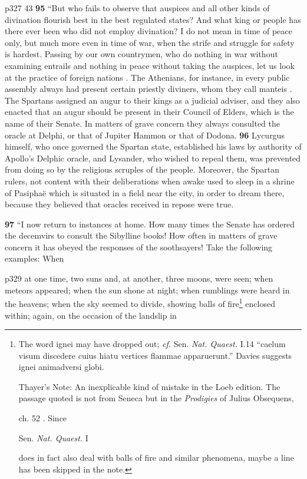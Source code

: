 p327
43
\textbf{95} ``But who fails to observe that auspices and all other kinds of divination flourish best in the best regulated states? And what king or people has there ever been who did not employ divination? I do not mean in time of peace only, but much more even in time of war, when the strife and struggle for safety is hardest. Passing by our own countrymen, who do nothing in war without examining entrails and nothing in peace without taking the auspices, let us look at the practice of foreign nations . The Athenians, for instance, in every public assembly always had present certain priestly diviners, whom they call manteis . The Spartans assigned an augur to their kings as a judicial adviser, and they also enacted that an augur should be present in their Council of Elders, which is the name of their Senate. In matters of grave concern they always consulted the oracle at Delphi, or that of Jupiter Hammon or that of Dodona. \textbf{96} Lycurgus himself, who once governed the Spartan state, established his laws by authority of Apollo's Delphic oracle, and Lysander, who wished to repeal them, was prevented from doing so by the religious scruples of the people. Moreover, the Spartan rulers, not content with their deliberations when awake used to sleep in a shrine of Pasiphaë which is situated in a field near the city, in order to dream there, because they believed that oracles received in repose were true.

\textbf{97} ``I now return to instances at home. How many times the Senate has ordered the decemvirs to consult the Sibylline books! How often in matters of grave concern it has obeyed the responses of the soothsayers! Take the following examples: When

p329 at one time, two suns and, at another, three moons, were seen; when meteors appeared; when the sun shone at night; when rumblings were heard in the heavens; when the sky seemed to divide, showing balls of fire\texthebrew{}\footnote{The word ignei may have dropped out; \emph{cf.} Sen. \emph{Nat. Quaest.} I.14 ``caelum visum discedere cuius hiatu vertices flammae apparuerunt.'' Davies suggests ignei animadversi globi.

Thayer's Note: An inexplicable kind of mistake in the Loeb edition. The passage quoted is not from Seneca but in the \emph{Prodigies} of Julius Obsequens,

ch. 52 . Since

Sen. \emph{Nat. Quaest.} I

does in fact also deal with balls of fire and similar phenomena, maybe a line has been skipped in the note.

} enclosed within; again, on the occasion of the landslip in

